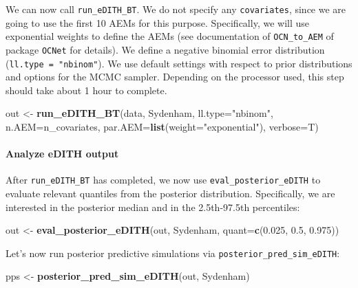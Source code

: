 \documentclass[
]{article}
\newenvironment{Shaded}{\begin{snugshade}}{\end{snugshade}}
\newcommand{\AttributeTok}[1]{\textcolor[rgb]{0.13,0.29,0.53}{#1}}
\newcommand{\FloatTok}[1]{\textcolor[rgb]{0.00,0.00,0.81}{#1}}
\newcommand{\FunctionTok}[1]{\textcolor[rgb]{0.13,0.29,0.53}{\textbf{#1}}}
\newcommand{\NormalTok}[1]{#1}
\newcommand{\OtherTok}[1]{\textcolor[rgb]{0.56,0.35,0.01}{#1}}
\newcommand{\StringTok}[1]{\textcolor[rgb]{0.31,0.60,0.02}{#1}}
\begin{document}
We can now call \texttt{run\_eDITH\_BT}. We do not specify any \texttt{covariates}, since we are going to use the first 10 AEMs for this purpose. Specifically, we will use exponential weights to define the AEMs (see documentation of \texttt{OCN\_to\_AEM} of package \texttt{OCNet} for details). We define a negative binomial error distribution (\texttt{ll.type\ =\ "nbinom"}). We use default settings with respect to prior distributions and options for the MCMC sampler. Depending on the processor used, this step should take about 1 hour to complete.

\begin{Shaded}
\begin{Highlighting}[]
\NormalTok{out }\OtherTok{\textless{}{-}} \FunctionTok{run\_eDITH\_BT}\NormalTok{(data, Sydenham, }\AttributeTok{ll.type=}\StringTok{"nbinom"}\NormalTok{,}
                    \AttributeTok{n.AEM=}\NormalTok{n\_covariates, }\AttributeTok{par.AEM=}\FunctionTok{list}\NormalTok{(}\AttributeTok{weight=}\StringTok{"exponential"}\NormalTok{),}
                    \AttributeTok{verbose=}\NormalTok{T)}
\end{Highlighting}
\end{Shaded}

\hypertarget{analyze-edith-output}{%
\paragraph{Analyze eDITH output}\label{analyze-edith-output}}

After \texttt{run\_eDITH\_BT} has completed, we now use \texttt{eval\_posterior\_eDITH} to evaluate relevant quantiles from the posterior distribution. Specifically, we are interested in the posterior median and in the 2.5th-97.5th percentiles:

\begin{Shaded}
\begin{Highlighting}[]
\NormalTok{out }\OtherTok{\textless{}{-}} \FunctionTok{eval\_posterior\_eDITH}\NormalTok{(out, Sydenham, }\AttributeTok{quant=}\FunctionTok{c}\NormalTok{(}\FloatTok{0.025}\NormalTok{, }\FloatTok{0.5}\NormalTok{, }\FloatTok{0.975}\NormalTok{))}
\end{Highlighting}
\end{Shaded}

Let's now run posterior predictive simulations via \texttt{posterior\_pred\_sim\_eDITH}:

\begin{Shaded}
\begin{Highlighting}[]
\NormalTok{pps }\OtherTok{\textless{}{-}} \FunctionTok{posterior\_pred\_sim\_eDITH}\NormalTok{(out, Sydenham)}
\end{Highlighting}
\end{Shaded}
\end{document}
